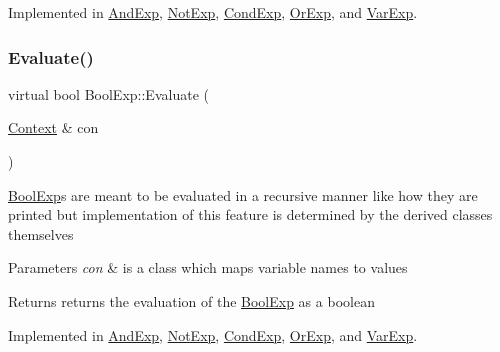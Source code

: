Implemented in \mbox{\hyperlink{classAndExp_a86a369f7f3bf7d4d157b9f0df9e6a315}{And\+Exp}}, \mbox{\hyperlink{classNotExp_adb36074264fb55186f781680cb6c35f9}{Not\+Exp}}, \mbox{\hyperlink{classCondExp_a07dc28d880912ea9553c75ebf26431e8}{Cond\+Exp}}, \mbox{\hyperlink{classOrExp_a142f557d9b95c4464dbd9167dbb9fe51}{Or\+Exp}}, and \mbox{\hyperlink{classVarExp_ad93ffa6aa927bc41c9765bc37b4d0a63}{Var\+Exp}}.

\mbox{\label{classBoolExp_a591fb5f9cb849e0f56e596406a9a10d0}} 
\subsubsection{\texorpdfstring{Evaluate()}{Evaluate()}}
{\footnotesize\ttfamily virtual bool Bool\+Exp\+::\+Evaluate (\begin{DoxyParamCaption}\item[{\mbox{\hyperlink{classContext}{Context}} \&}]{con }\end{DoxyParamCaption})\hspace{0.3cm}{\ttfamily [pure virtual]}}

\mbox{\hyperlink{classBoolExp}{Bool\+Exp}}\textquotesingle{}s are meant to be evaluated in a recursive manner like how they are printed but implementation of this feature is determined by the derived classes themselves 
\begin{DoxyParams}{Parameters}
{\em con} & is a class which maps variable names to values \\
\hline
\end{DoxyParams}
\begin{DoxyReturn}{Returns}
returns the evaluation of the \mbox{\hyperlink{classBoolExp}{Bool\+Exp}} as a boolean 
\end{DoxyReturn}


Implemented in \mbox{\hyperlink{classAndExp_a7708cad60cf9b0913d30a7164ed8aceb}{And\+Exp}}, \mbox{\hyperlink{classNotExp_a4bf3ac9a898127b4d0c63db2a5f7a82f}{Not\+Exp}}, \mbox{\hyperlink{classCondExp_a36c86af1adba98b0ab7d15fa53e4027f}{Cond\+Exp}}, \mbox{\hyperlink{classOrExp_a2056a325b87621e2a3d0afff79c4163e}{Or\+Exp}}, and \mbox{\hyperlink{classVarExp_af9d73e76a255123e00d5ebb1ae703188}{Var\+Exp}}.

\mbox{\label{classBoolExp_a0e5d4a241332ae72d083645e4b71e0e6}} 
